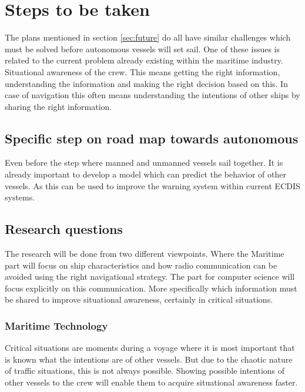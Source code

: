 \chapter*{Steps to be taken}
The plans mentioned in section \ref{sec:future} do all have similar challenges which must be solved before autonomous vessels will set sail. One of these issues is related to the current problem already existing within the maritime industry. Situational awareness of the crew. This means getting the right information, understanding the information and making the right decision based on this. In case of navigation this often means understanding the intentions of other ships by sharing the right information.

\section*{Specific step on road map towards autonomous}
Even before the step where manned and unmanned vessels sail together. It is already important to develop a model which can predict the behavior of other vessels. As this can be used to improve the warning system within current ECDIS systems. 

\section*{Research questions}
The research will be done from two different viewpoints. Where the Maritime part will focus on ship characteristics and how radio communication can be avoided using the right navigational strategy. The part for computer science will focus explicitly on this communication. More specifically which information must be shared to improve situational awareness, certainly in critical situations.

\subsection*{Maritime Technology}
Critical situations are moments during a voyage where it is most important that is known what the intentions are of other vessels. But due to the chaotic nature of traffic situations, this is not always possible. Showing possible intentions of other vessels to the crew will enable them to acquire situational awareness faster. 

